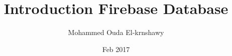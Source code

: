 \documentclass[a4paper,12pt]{book}
\begin{document}
\author{Mohammed Ouda El-krnshawy}
\title{Introduction Firebase Database }
\date{Feb 2017}
\frontmatter
\maketitle


\tableofcontents

\mainmatter





\backmatter


\end{document}
